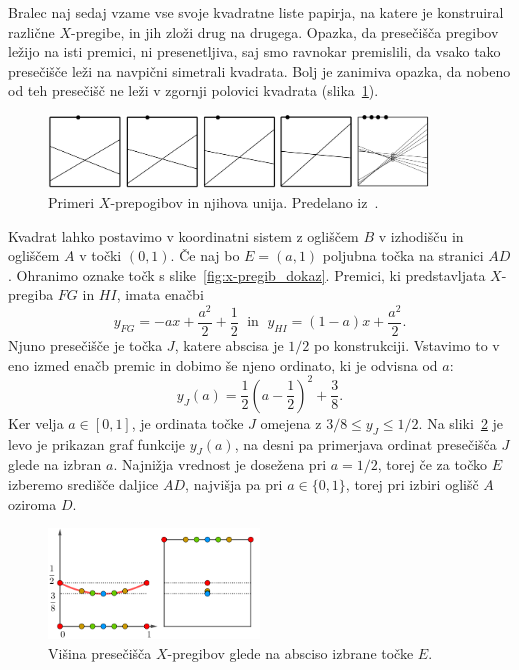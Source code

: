 Bralec naj sedaj vzame vse svoje kvadratne liste papirja, na katere je konstruiral različne $X$-pregibe, in jih zloži drug na drugega. Opazka, da presečišča pregibov ležijo na isti premici, ni presenetljiva, saj smo ravnokar premislili, da vsako tako presečišče leži na navpični simetrali kvadrata. Bolj je zanimiva opazka, da nobeno od teh presečišč ne leži v zgornji polovici kvadrata (slika~\ref{fig:x-pregib_primeri_skup}).

\begin{figure}[h]
    \centering
    \includegraphics[width=0.9\textwidth]{images/x-pregibi/primeri_skupaj.png}
    \caption[Primeri $X$-pregibov]{Primeri $X$-prepogibov in njihova unija. Predelano iz~\cite[str.\ 36]{haga2008}.}
    \label{fig:x-pregib_primeri_skup}
\end{figure}

Kvadrat lahko postavimo v koordinatni sistem z ogliščem $B$ v izhodišču in ogliščem $A$ v točki $(0,1)$. Če naj bo $E = (a, 1)$ poljubna točka na stranici $AD$. Ohranimo oznake točk s slike~\ref{fig:x-pregib_dokaz}. Premici, ki predstavljata $X$-pregiba $FG$ in $HI$, imata enačbi
$$ y_{FG} = -ax + \frac{a^2}{2} + \frac{1}{2} \; \text{ in } \; y_{HI} = (1-a)x + \frac{a^2}{2}. $$
Njuno presečišče je točka $J$, katere abscisa je $1/2$ po konstrukciji. Vstavimo to v eno izmed enačb premic in dobimo še njeno ordinato, ki je odvisna od $a$:
$$ y_J(a) = \frac{1}{2} \left(a - \frac{1}{2}\right)^2 + \frac{3}{8}. $$
Ker velja $a \in [0,1]$, je ordinata točke $J$ omejena z $3/8 \leq y_J \leq 1/2$. Na sliki~\ref{fig:x-pregib_visina_pres} je levo je prikazan graf funkcije $y_J(a)$, na desni pa primerjava ordinat presečišča $J$ glede na izbran $a$. Najnižja vrednost je dosežena pri $a = 1/2$, torej če za točko $E$ izberemo središče daljice $AD$, najvišja pa pri $a \in \{0, 1\}$, torej pri izbiri oglišč $A$ oziroma $D$.
\begin{figure}[h]
    \centering
    \includegraphics[width=0.5\textwidth]{images/x-pregibi/visina_presecisca.png}
    \caption[Višina presečišča $X$-pregibov]{Višina presečišča $X$-pregibov glede na absciso izbrane točke $E$.}
    \label{fig:x-pregib_visina_pres}
\end{figure}

